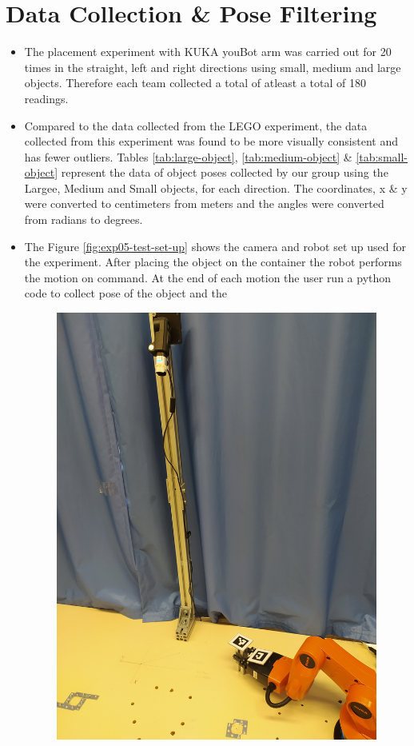     \section{Data Collection \& Pose Filtering}
    \begin{itemize}
        \item The placement experiment with KUKA youBot arm was carried out for 20 times in the straight, left and right directions using small, medium and large objects. Therefore each team collected a total of atleast a total of 180 readings.
        \item Compared to the data collected from the LEGO experiment, the data collected from this experiment was found to be more visually consistent and has fewer outliers. Tables \ref{tab:large-object}, \ref{tab:medium-object} \& \ref{tab:small-object} represent the data of object poses collected by our group using the Largee, Medium and Small objects, for each direction. The coordinates, x \& y were converted to centimeters from meters and the angles were converted from radians to degrees.
        \item The Figure \ref{fig:exp05-test-set-up} shows the camera and robot set up used for the experiment. After placing the object on the container the robot performs the motion on command. At the end of each motion the user run a python code to collect pose of the object and the 
        \begin{figure}[H] 
            \centering \includegraphics[width=\textwidth]{"images/experiment_5/camera_system.jpg"}

\end{figure}
\end{itemize}
